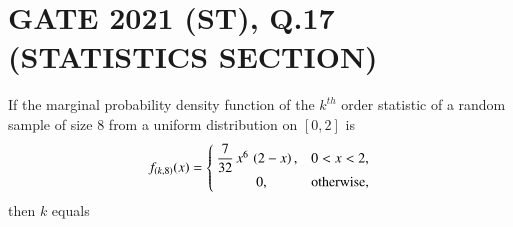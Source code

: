 \documentclass[journal,12pt,twocolumn]{IEEEtran}
\begin{document}
\section{GATE 2021 (ST), Q.17 (STATISTICS SECTION)} 
If the marginal probability density function of the $k^{th}$ order statistic of a 
random sample of size 8 from a uniform distribution on $[0,2]$ is
\begin{align}
  f_{(k,8)}(x) =
  \begin{cases}
   \dfrac{7}{32}\,x^{6}\,\left(2-x\right),  & 0<x<2, \\ 
      \hspace{1cm}   0,               & \text{otherwise,} 
  \end{cases}
\label{qnpdf}
\end{align}
then $k$ equals \underline{\hspace{3cm}}
\vspace{0.2cm}
\end{document}
